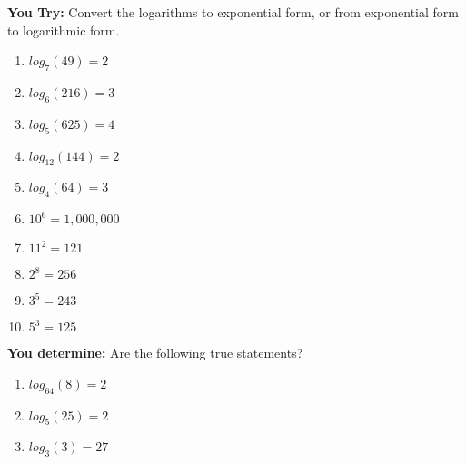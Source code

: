 \documentclass[12pt]{article}
\begin{document}
\pagebreak

\textbf{You Try:} Convert the logarithms to exponential form, or from exponential form to logarithmic form.\\

\begin{multicols}{2}
\begin{enumerate}
	\setlength\itemsep{1cm}

	\item $log_{7}(49)=2$\\	
		
	\item $log_{6}(216)=3$\\
	
	\item $log_{5}(625)=4$\\
		
	\item $log_{12}(144)=2$\\
	
	\item $log_{4}(64)=3$\\
	
	\item $10^6=1,000,000$\\
	
	\item $11^2=121$\\
	
	\item $2^8=256$\\
	
	\item $3^5=243$\\
	
	\item $5^3=125$\\
\end{enumerate}
\end{multicols}


\textbf{You determine:} Are the following true statements?\\

\begin{enumerate}[resume]
	\setlength\itemsep{2cm}
	
	\item $log_{64}(8)=2$\\
	
	\item $log_{5}(25)=2$\\
	
	\item $log_{3}(3)=27$\\

\end{enumerate}
\end{document}
